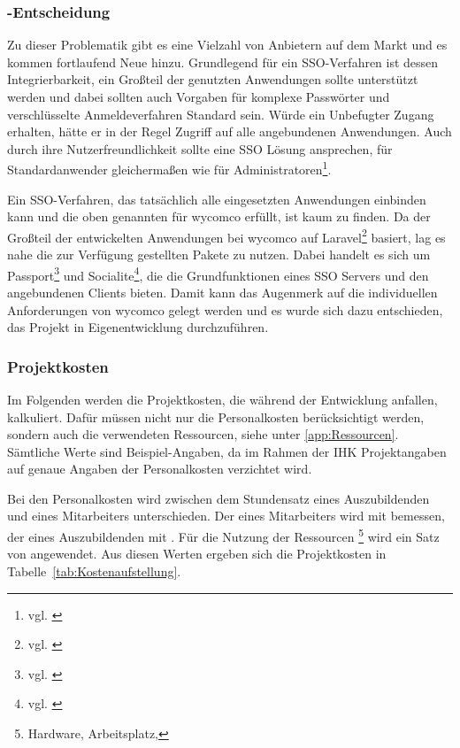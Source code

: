\subsubsection{-Entscheidung}
\label{sec:MakeOrBuyEntscheidung}

Zu dieser Problematik gibt es eine Vielzahl von Anbietern auf dem Markt und es kommen fortlaufend Neue hinzu. 
Grundlegend für ein \ac{SSO}-Verfahren ist dessen Integrierbarkeit, ein Großteil der genutzten Anwendungen sollte unterstützt werden und dabei sollten auch Vorgaben für komplexe Passwörter und verschlüsselte Anmeldeverfahren Standard sein. Würde ein Unbefugter Zugang erhalten, hätte er in der Regel Zugriff auf alle angebundenen Anwendungen.
Auch durch ihre Nutzerfreundlichkeit sollte eine \acs{SSO} Lösung ansprechen, für Standardanwender gleichermaßen wie für Administratoren\footnote{vgl. \cite{computerwoche}}.

Ein \ac{SSO}-Verfahren, das tatsächlich alle eingesetzten Anwendungen einbinden kann und die oben genannten für wycomco erfüllt, ist kaum zu finden. Da der Großteil der entwickelten Anwendungen bei wycomco auf Laravel\footnote{vgl. \cite{Laravel}} basiert, lag es nahe die zur Verfügung gestellten Pakete zu nutzen. Dabei handelt es sich um Passport\footnote{vgl. \cite{Passport}} und Socialite\footnote{vgl. \cite{Socialite}}, die die Grundfunktionen eines SSO Servers und den angebundenen Clients bieten. Damit kann das Augenmerk auf die individuellen Anforderungen von wycomco gelegt werden und es wurde sich dazu entschieden, das Projekt in Eigenentwicklung durchzuführen.


\subsubsection{Projektkosten}
\label{sec:Projektkosten}

Im Folgenden werden die Projektkosten, die während der Entwicklung anfallen, kalkuliert. 
Dafür müssen nicht nur die Personalkosten berücksichtigt werden, sondern auch die verwendeten Ressourcen, siehe unter \ref{app:Ressourcen}. Sämtliche Werte sind Beispiel-Angaben, da im Rahmen der IHK Projektangaben auf genaue Angaben der Personalkosten verzichtet wird. 

Bei den Personalkosten wird zwischen dem Stundensatz eines Auszubildenden und eines Mitarbeiters unterschieden. Der eines Mitarbeiters wird mit  bemessen, der eines Auszubildenden mit .
Für die Nutzung der Ressourcen \footnote{Hardware, Arbeitsplatz, \etc} wird ein Satz von  angewendet.
Aus diesen Werten ergeben sich die Projektkosten in Tabelle~\ref{tab:Kostenaufstellung}.

